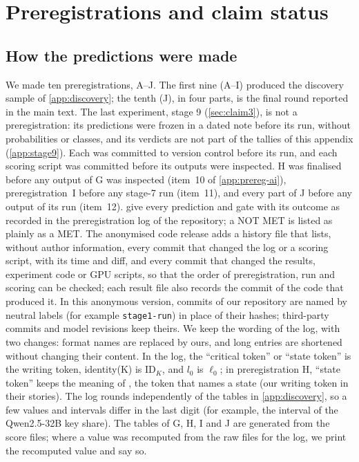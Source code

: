 \section{Preregistrations and claim status}\label{app:prereg}

\subsection{How the predictions were made}\label{app:prereg-how}

We made ten preregistrations, A--J. The first nine (A--I) produced the discovery sample of \cref{app:discovery}; the tenth (J), in four parts, is the final round reported in the main text. The last experiment, stage 9 (\cref{sec:claim3}), is not a preregistration: its predictions were frozen in a dated note before its run, without probabilities or classes, and its verdicts are not part of the tallies of this appendix (\cref{app:stage9}). Each was committed to version control before its run, and each scoring script was committed before its outputs were inspected. H was finalised before any output of G was inspected (item~10 of \cref{app:prereg-ai}), preregistration~I before any stage-7 run (item~11), and every part of J before any output of its run (item~12).  give every prediction and gate with its outcome as recorded in the preregistration log of the repository; a NOT MET is listed as plainly as a MET. The anonymised code release adds a history file that lists, without author information, every commit that changed the log or a scoring script, with its time and diff, and every commit that changed the results, experiment code or GPU scripts, so that the order of preregistration, run and scoring can be checked; each result file also records the commit of the code that produced it. In this anonymous version, commits of our repository are named by neutral labels (for example \texttt{stage1-run}) in place of their hashes; third-party commits and model revisions keep theirs. We keep the wording of the log, with two changes: format names are replaced by ours, and long entries are shortened without changing their content. In the log, the ``critical token'' or ``state token'' is the writing token, identity(K) is $\mathrm{ID}_K$, and $l_0$ is $\ell_0$; in preregistration H, ``state token'' keeps the meaning of \citet{prakash2025lookbacks}, the token that names a state (our writing token in their stories). The log rounds independently of the tables in \cref{app:discovery}, so a few values and intervals differ in the last digit (for example, the interval of the Qwen2.5-32B key share). The tables of G, H, I and J are generated from the score files; where a value was recomputed from the raw files for the log, we print the recomputed value and say so.

